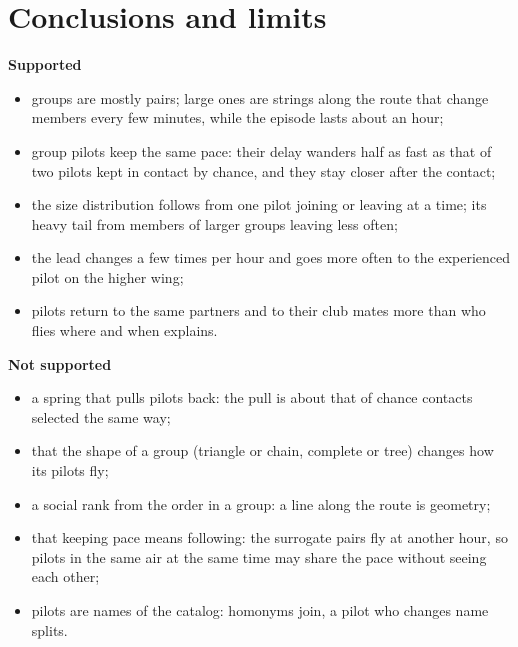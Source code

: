 \section{Conclusions and limits}\label{sec:conclusions}

\begin{minipage}[t]{0.49\textwidth}
\textbf{Supported}
\begin{itemize}
  \item groups are mostly pairs; large ones are strings along the route that change members every few minutes,
        while the episode lasts about an hour;
  \item group pilots keep the same pace: their delay wanders half as fast as that of two pilots kept in
        contact by chance, and they stay closer after the contact;
  \item the size distribution follows from one pilot joining or leaving at a time; its heavy tail from members
        of larger groups leaving less often;
  \item the lead changes a few times per hour and goes more often to the experienced pilot on the higher wing;
  \item pilots return to the same partners and to their club mates more than who flies where and when explains.
\end{itemize}
\end{minipage}\hfill
\begin{minipage}[t]{0.49\textwidth}
\textbf{Not supported}
\begin{itemize}
  \item a spring that pulls pilots back: the pull is about that of chance contacts selected the same way;
  \item that the shape of a group (triangle or chain, complete or tree) changes how its pilots fly;
  \item a social rank from the order in a group: a line along the route is geometry;
  \item that keeping pace means following: the surrogate pairs fly at another hour, so pilots in the same
        air at the same time may share the pace without seeing each other;
  \item pilots are names of the catalog: homonyms join, a pilot who changes name splits.
\end{itemize}
\end{minipage}
